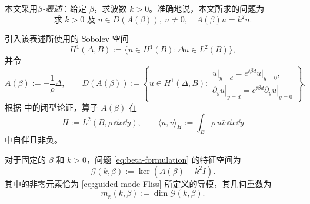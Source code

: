 本文采用\emph{$\beta$-表述}：给定 $\beta$，求波数 $k>0$。准确地说，本文所求的问题为
\begin{equation}
  \boxed{\quad
  \text{求 }k>0\text{ 及 }u\in D(A(\beta)),\ u\neq0,
  \quad A(\beta)u=k^2u.\quad}
  \tag{$E^\beta$}
  \label{eq:beta-formulation}
\end{equation}
\addtocounter{equation}{1}
引入该表述所使用的 Sobolev 空间
\begin{equation}
  H^1(\Delta,B):=\{u\in H^1(B):\Delta u\in L^2(B)\},
  \label{eq:H1-Delta}
\end{equation}
并令
\begin{equation}
  A(\beta):=-\frac{1}{\rho}\Delta,
  \qquad
  D(A(\beta)):=\left\{u\in H^1(\Delta,B):
  \begin{array}{l}
    \left.u\right|_{y=d}
      =e^{\ii\beta d}\left.u\right|_{y=0},\\[-1mm]
    \left.\partial_yu\right|_{y=d}
      =e^{\ii\beta d}\left.\partial_yu\right|_{y=0}
  \end{array}\right\}.
  \label{eq:Abeta}
\end{equation}
根据 \cite[Section~3]{Fliss2013} 中的闭型论证，算子 $A(\beta)$ 在
\begin{equation}
  H:=L^2(B,\rho\,\dd x\dd y),
  \qquad \langle u,v\rangle_H:=\int_B\rho\,u\overline v\,\dd x\dd y
  \label{eq:weighted-Hilbert-space}
\end{equation}
中自伴且非负。

\begin{definition}
\label{def:guided-space}
对于固定的 $\beta$ 和 $k>0$，问题 \eqref{eq:beta-formulation} 的特征空间为
\begin{equation}
  \mathcal G(k,\beta)
  :=\ker(A(\beta)-k^2I).
  \label{eq:guided-space}
\end{equation}
其中的非零元素恰为 \eqref{eq:guided-mode-Fliss} 所定义的导模，其几何重数为
\begin{equation}
  m_{\mathrm g}(k,\beta):=\dim\mathcal G(k,\beta).
  \label{eq:geometric-multiplicity}
\end{equation}
\end{definition}

